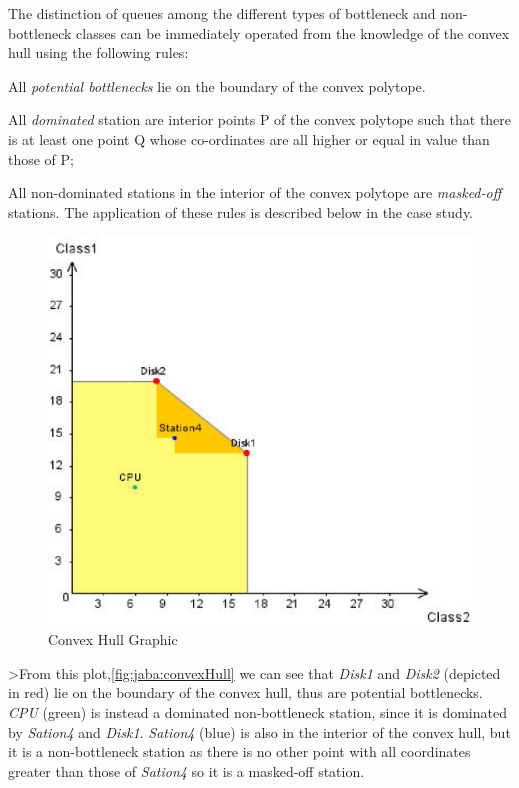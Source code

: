 The distinction of queues among the different types of bottleneck and non-bottleneck classes can be immediately operated from the knowledge of the convex hull using the following rules:
\begin{itemize*}
    \item All \emph{potential bottlenecks} lie on the boundary of the convex polytope.
    \item All \emph{dominated} station are interior points P of the convex polytope such that there is at least one point Q whose co-ordinates are all higher or equal in value than those of P;
    \item All non-dominated stations in the interior of the convex polytope are \emph{masked-off} stations.
The application of these rules is described below in the case study.
\end{itemize*}
\begin{figure}[htbp]
    \begin{center}
        \includegraphics[scale=.5]{img/jaba/convexHull}
    \end{center}
    \caption{Convex Hull Graphic}
    \label{fig:jaba:convexHull}
\end{figure}

>From this plot,\autoref{fig:jaba:convexHull} we can see that \emph{Disk1} and \emph{Disk2} (depicted in red) lie on the boundary of the convex hull, thus are potential bottlenecks. \emph{CPU} (green) is instead a dominated non-bottleneck station, since  it is dominated by \emph{Sation4} and \emph{Disk1}. \emph{Sation4} (blue) is also in the interior of the convex hull, but it is a non-bottleneck station as there is no other point with all coordinates greater than those of \emph{Sation4} so it is a masked-off station.

